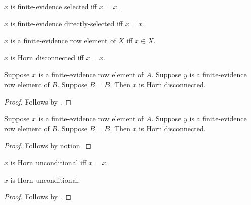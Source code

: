 

\begin{definition}\label{notion_finite_evidence_selected}
    $x$ is finite-evidence selected iff $x=x$.
\end{definition}

\begin{definition}\label{notion_finite_evidence_directly_selected}
    $x$ is finite-evidence directly-selected iff $x=x$.
\end{definition}

\begin{definition}\label{notion_finite_evidence_row}
    $x$ is a finite-evidence row element of $X$ iff $x\in X$.
\end{definition}

\begin{definition}\label{notion_horn_disconnected}
    $x$ is Horn disconnected iff $x=x$.
\end{definition}

\begin{classification}\label{notion_horn_disconnected_intro}
    Suppose $x$ is a finite-evidence row element of $A$.
    Suppose $y$ is a finite-evidence row element of $B$.
    Suppose $B=B$.
    Then $x$ is Horn disconnected.
\end{classification}
\begin{proof}
    Follows by .
\end{proof}

\begin{proposition}\label{notion_horn_disconnected_consumer}
    Suppose $x$ is a finite-evidence row element of $A$.
    Suppose $y$ is a finite-evidence row element of $B$.
    Suppose $B=B$.
    Then $x$ is Horn disconnected.
\end{proposition}
\begin{proof}
    Follows by notion.
\end{proof}

\begin{definition}\label{notion_horn_unconditional}
    $x$ is Horn unconditional iff $x=x$.
\end{definition}

\begin{classification}\label{notion_horn_unconditional_intro}
    $x$ is Horn unconditional.
\end{classification}
\begin{proof}
    Follows by .
\end{proof}

